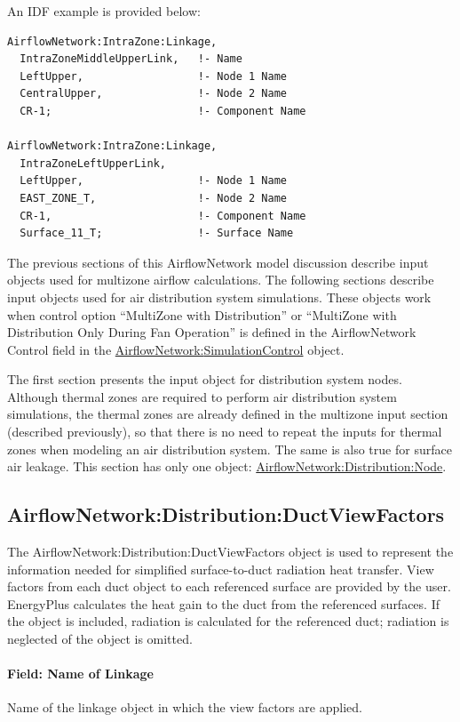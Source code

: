 An IDF example is provided below:

\begin{lstlisting}
AirflowNetwork:IntraZone:Linkage,
  IntraZoneMiddleUpperLink,   !- Name
  LeftUpper,                  !- Node 1 Name
  CentralUpper,               !- Node 2 Name
  CR-1;                       !- Component Name

AirflowNetwork:IntraZone:Linkage,
  IntraZoneLeftUpperLink,
  LeftUpper,                  !- Node 1 Name
  EAST_ZONE_T,                !- Node 2 Name
  CR-1,                       !- Component Name
  Surface_11_T;               !- Surface Name
\end{lstlisting}

The previous sections of this AirflowNetwork model discussion describe input objects used for multizone airflow calculations. The following sections describe input objects used for air distribution system simulations. These objects work when control option ``MultiZone with Distribution'' or ``MultiZone with Distribution Only During Fan Operation'' is defined in the AirflowNetwork Control field in the \hyperref[airflownetworksimulationcontrol]{AirflowNetwork:\hyperref[simulationcontrol]{SimulationControl}} object.

The first section presents the input object for distribution system nodes. Although thermal zones are required to perform air distribution system simulations, the thermal zones are already defined in the multizone input section (described previously), so that there is no need to repeat the inputs for thermal zones when modeling an air distribution system. The same is also true for surface air leakage. This section has only one object: \hyperref[airflownetworkdistributionnode]{AirflowNetwork:Distribution:Node}.

\subsection{AirflowNetwork:Distribution:DuctViewFactors}\label{airflownetworkdistributionductviewfactor}
The AirflowNetwork:Distribution:DuctViewFactors object is used to represent the information needed for simplified surface-to-duct radiation heat transfer. View factors from each duct object to each referenced surface are provided by the user. EnergyPlus calculates the heat gain to the duct from the referenced surfaces. If the object is included, radiation is calculated for the referenced duct; radiation is neglected of the object is omitted.

\paragraph{Field: Name of Linkage}\label{field-name-of-linkage}
Name of the linkage object in which the view factors are applied.


